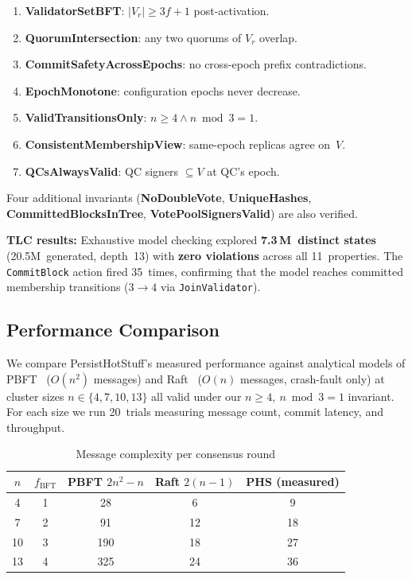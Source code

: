 \documentclass{SVProc}
\begin{document}
\begin{enumerate}[label=\textbf{\arabic*},leftmargin=*,nosep]
  \item \textbf{ValidatorSetBFT}: $|V_r| \ge 3f{+}1$ post-activation.
  \item \textbf{QuorumIntersection}: any two quorums of $V_r$ overlap.
  \item \textbf{CommitSafetyAcrossEpochs}: no cross-epoch prefix contradictions.
  \item \textbf{EpochMonotone}: configuration epochs never decrease.
  \item \textbf{ValidTransitionsOnly}: $n \ge 4 \wedge n \bmod 3 = 1$.
  \item \textbf{ConsistentMembershipView}: same-epoch replicas agree on~$V$.
  \item \textbf{QCsAlwaysValid}: QC signers $\subseteq V$ at QC's epoch.
\end{enumerate}

\noindent Four additional invariants (\textbf{NoDoubleVote},
\textbf{UniqueHashes}, \textbf{CommittedBlocksInTree},
\textbf{VotePoolSignersValid}) are also verified.

\smallskip\noindent\textbf{TLC results:}\quad
Exhaustive model checking explored \textbf{7.3\,M~distinct states}
(20.5M~generated, depth~13) with \textbf{zero violations} across all
11~properties.  The \texttt{CommitBlock} action fired 35~times,
confirming that the model reaches committed membership transitions
($3 \to 4$ via \texttt{JoinValidator}).

\subsection{Performance Comparison}
\label{sec:performance}

We compare PersistHotStuff's measured performance against analytical
models of PBFT~\cite{pbft1999} ($O(n^2)$ messages) and
Raft~\cite{raft2014} ($O(n)$ messages, crash-fault only) at cluster
sizes $n \in \{4, 7, 10, 13\}$ all valid under our
$n \ge 4,\ n \bmod 3 = 1$ invariant.  For each size we run 20~trials
measuring message count, commit latency, and throughput.

\begin{table}[t]
\caption{Message complexity per consensus round}
\centering
\begin{tabular}{ccccc}
\toprule
$n$ & $f_{\text{BFT}}$ & \textbf{PBFT} $2n^2{-}n$
  & \textbf{Raft} $2(n{-}1)$ & \textbf{PHS} (measured) \\
\midrule
 4 & 1 &  28 &  6 &  9 \\
 7 & 2 &  91 & 12 & 18 \\
10 & 3 & 190 & 18 & 27 \\
13 & 4 & 325 & 24 & 36 \\
\bottomrule
\end{tabular}
\label{tab:messages}
\end{table}
\end{document}
